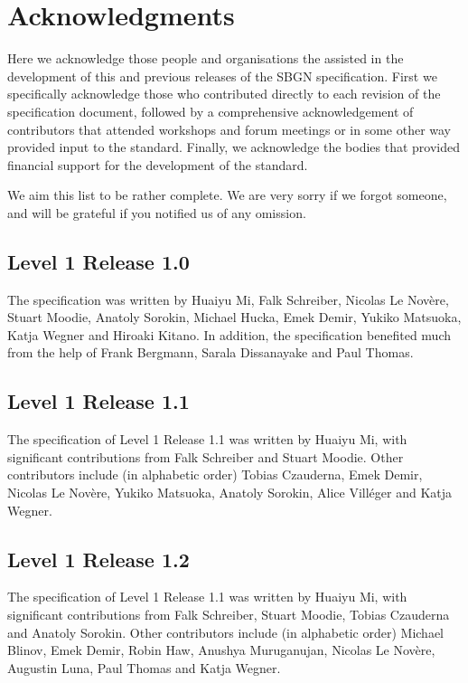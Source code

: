 \chapter{Acknowledgments}\label{sec:acknowledgments}

Here we acknowledge those people and organisations the assisted in the development of this and previous releases of the SBGN \AFl specification. First we specifically acknowledge those who contributed directly to each revision of the  specification document, followed by a comprehensive acknowledgement of contributors that attended workshops and forum meetings or in some other way provided input to the standard. Finally, we acknowledge the bodies that provided financial support for the development of the standard.


 We aim this list to be rather complete. We are very sorry if we forgot someone, and will be grateful if you notified us of any omission.

\section{Level 1 Release 1.0}

The specification was written by Huaiyu Mi, Falk Schreiber, Nicolas Le Nov\`{e}re, Stuart Moodie, Anatoly Sorokin, Michael Hucka, Emek Demir, Yukiko Matsuoka, Katja Wegner and Hiroaki Kitano. In addition, the specification benefited much from the help of Frank Bergmann, Sarala Dissanayake and Paul Thomas.

\section{Level 1 Release 1.1}
The specification of \AF Level 1 Release 1.1 was written by Huaiyu Mi, with significant contributions from Falk Schreiber and Stuart Moodie.  Other contributors include (in alphabetic order) Tobias Czauderna, Emek Demir, Nicolas Le Nov\`{e}re, Yukiko Matsuoka, Anatoly Sorokin, Alice Vill\'{e}ger and Katja Wegner.

\section{Level 1 Release 1.2}
The specification of \AF Level 1 Release 1.1 was written by Huaiyu Mi, with significant contributions from Falk Schreiber, Stuart Moodie, Tobias Czauderna and Anatoly Sorokin.  Other contributors include (in alphabetic order) Michael Blinov, Emek Demir, Robin Haw, Anushya Muruganujan, Nicolas Le Nov\`{e}re, Augustin Luna, Paul Thomas and Katja Wegner.

